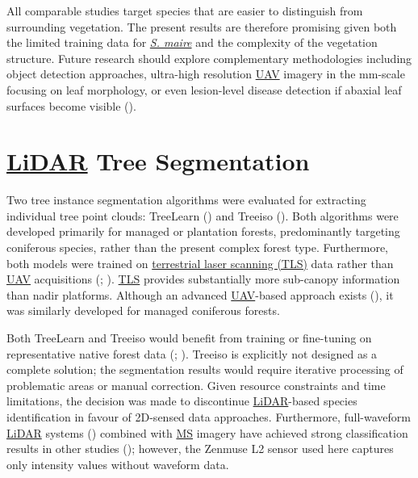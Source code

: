 \documentclass[
]{scrreprt}
\begin{document}
All comparable studies target species that are easier to distinguish
from surrounding vegetation. The present results are therefore promising
given both the limited training data for \hyperref[acronyms_SM]{\emph{S.
maire}} and the complexity of the vegetation structure. Future research
should explore complementary methodologies including object detection
approaches, ultra-high resolution \hyperref[acronyms_UAV]{UAV} imagery
in the mm-scale focusing on leaf morphology, or even lesion-level
disease detection if abaxial leaf surfaces become visible
().

\section{\texorpdfstring{\hyperref[acronyms_LiDAR]{LiDAR} Tree
Segmentation}{LiDAR Tree Segmentation}}\label{tree-segmentation-1}

Two tree instance segmentation algorithms were evaluated for extracting
individual tree point clouds: TreeLearn
() and
Treeiso (). Both
algorithms were developed primarily for managed or plantation forests,
predominantly targeting coniferous species, rather than the present
complex forest type. Furthermore, both models were trained on
\hyperref[acronyms_TLS]{terrestrial laser scanning (TLS)} data rather
than \hyperref[acronyms_UAV]{UAV} acquisitions
(;
).
\hyperref[acronyms_TLS]{TLS} provides substantially more sub-canopy
information than nadir platforms. Although an advanced
\hyperref[acronyms_UAV]{UAV}-based approach exists
(), it was
similarly developed for managed coniferous forests.

Both TreeLearn and Treeiso would benefit from training or fine-tuning on
representative native forest data
(;
). Treeiso is
explicitly not designed as a complete solution; the segmentation results
would require iterative processing of problematic areas or manual
correction. Given resource constraints and time limitations, the
decision was made to discontinue \hyperref[acronyms_LiDAR]{LiDAR}-based
species identification in favour of 2D-sensed data approaches.
Furthermore, full-waveform \hyperref[acronyms_LiDAR]{LiDAR} systems
()
combined with \hyperref[acronyms_MS]{MS} imagery have achieved strong
classification results in other studies
();
however, the Zenmuse L2 sensor used here captures only intensity values
without waveform data.
\end{document}
